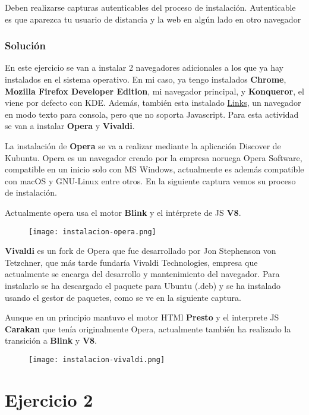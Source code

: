 Deben realizarse capturas autenticables del proceso de instalación.  Autenticable es que aparezca tu usuario de distancia y la web en algún lado en otro navegador

\subsubsection{Solución}
En este ejercicio se van a instalar 2 navegadores adicionales a los que ya hay instalados en el sistema operativo. En mi caso, ya tengo instalados \textbf{Chrome}, \textbf{Mozilla Firefox Developer Edition}, mi navegador principal, y \textbf{Konqueror}, el viene por defecto con KDE. Además, también esta instalado \href{https://es.wikipedia.org/wiki/Links}{Links}, un navegador en modo texto para consola, pero que no soporta Javascript. Para esta actividad se van a instalar \textbf{Opera} y \textbf{Vivaldi}.

La instalación de \textbf{Opera} se va a realizar mediante la aplicación Discover de Kubuntu. Opera es un navegador creado por la empresa noruega Opera Software, compatible en un inicio solo con MS Windows, actualmente es además compatible con macOS y GNU-Linux entre otros. En la siguiente captura vemos su proceso de instalación.

Actualmente opera usa el motor \textbf{Blink} y el intérprete de JS \textbf{V8}.

\begin{figure}[H]
    \centering
    \texttt{[image: instalacion-opera.png]}
\end{figure}

\textbf{Vivaldi} es un fork de Opera que fue desarrollado por Jon Stephenson von Tetzchner, que más tarde fundaría Vivaldi Technologies, empresa que actualmente se encarga del desarrollo y mantenimiento del navegador. Para instalarlo se ha descargado el paquete para Ubuntu (.deb) y se ha instalado usando el gestor de paquetes, como se ve en la siguiente captura.

Aunque en un principio mantuvo el motor HTMl \textbf{Presto} y el interprete JS \textbf{Carakan} que tenía originalmente Opera, actualmente también ha realizado la transición a \textbf{Blink} y \textbf{V8}.

\begin{figure}[H]
    \centering
    \texttt{[image: instalacion-vivaldi.png]}
\end{figure}

\section{Ejercicio 2}
